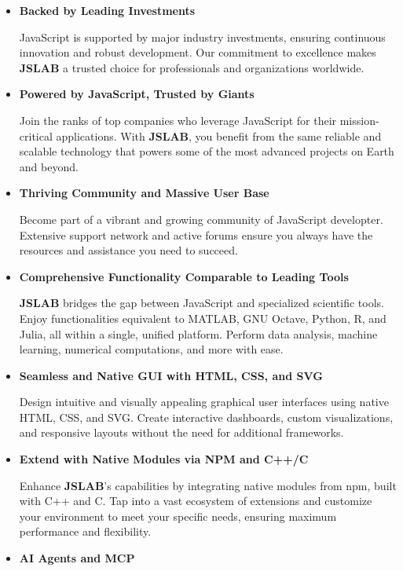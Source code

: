 \documentclass[12pt,a4paper]{article}
\begin{document}
\begin{itemize}
    \item \textbf{Backed by Leading Investments}

JavaScript is supported by major industry investments, ensuring continuous innovation and robust development. Our commitment to excellence makes \textbf{JSLAB} a trusted choice for professionals and organizations worldwide.

\item \textbf{Powered by JavaScript, Trusted by Giants}

Join the ranks of top companies who leverage JavaScript for their mission-critical applications. With \textbf{JSLAB}, you benefit from the same reliable and scalable technology that powers some of the most advanced projects on Earth and beyond.

\item \textbf{Thriving Community and Massive User Base}

Become part of a vibrant and growing community of JavaScript developter. Extensive support network and active forums ensure you always have the resources and assistance you need to succeed.

\item \textbf{Comprehensive Functionality Comparable to Leading Tools}

\textbf{JSLAB} bridges the gap between JavaScript and specialized scientific tools. Enjoy functionalities equivalent to MATLAB, GNU Octave, Python, R, and Julia, all within a single, unified platform. Perform data analysis, machine learning, numerical computations, and more with ease.

\item \textbf{Seamless and Native GUI with HTML, CSS, and SVG}

Design intuitive and visually appealing graphical user interfaces using native HTML, CSS, and SVG. Create interactive dashboards, custom visualizations, and responsive layouts without the need for additional frameworks.

\item \textbf{Extend with Native Modules via NPM and C++/C}

Enhance \textbf{JSLAB}’s capabilities by integrating native modules from npm, built with C++ and C. Tap into a vast ecosystem of extensions and customize your environment to meet your specific needs, ensuring maximum performance and flexibility.

\item \textbf{AI Agents and MCP}


\end{itemize}
\end{document}
